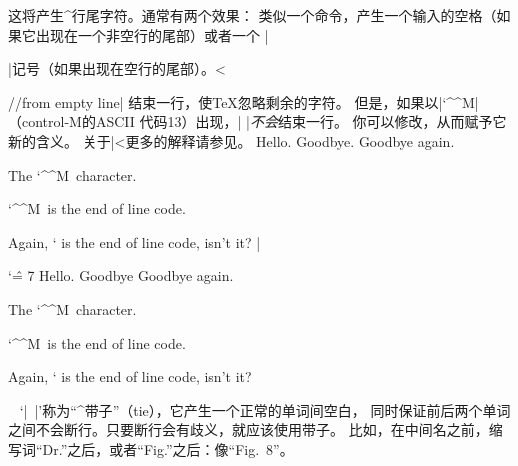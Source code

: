 \begindesc
\ctsact  ^^M 
\explain
这将产生^{行尾}字符。通常有两个效果：
\olist
\li 类似一个命令，产生一个输入的空格（如果它出现在一个非空行的尾部）或者一个
|\par|记号（如果出现在空行的尾部）。^^|\par//from empty line|
\li 结束一行，使\TeX{}忽略剩余的字符。
\endolist
\noindent
但是，如果以|`\^^M|（control-M的ASCII 代码13）出现，|^^M|\emph{不会}结束一行。
你可以修改，从而赋予它新的含义。
关于|^^|更多的解释请参见。
\example
Hello.^^MGoodbye.
Goodbye again.\par
The \char `\^^M\ character.\par
\number `\^^M\ is the end of line code.\par
Again, \number `^^M is the end of line code,
isn't it? %
|
\produces
{\catcode `\^ = 7 %
Hello.^^MGoodbye
Goodbye again.\par
The \char `\^^M\ character.\par
\number `\^^M\ is the end of line code.\par
Again, \number `^^M is the end of line code,
isn't it?}
\endexample
\enddesc

%


\begindesc
\easy\ctsact ~ 
\explain
{}`|~|'称为``^{带子}''（tie），它产生一个正常的单词间空白，
同时保证前后两个单词之间不会断行。只要断行会有歧义，就应该使用带子。
比如，在中间名之前，缩写词``Dr.''之后，或者``Fig.''之后：像``Fig.~8''。

